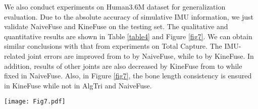 \documentclass[lettersize,journal]{IEEEtran}
\begin{document}
\begin{table}[!tp]
\caption{Ablation study on the usage of IMUs. Upper represents the upper arms and thighs while lower represents the forearms and calves. 4 and 8 denotes the number of IMUs attached to body bones.}
\begin{center}
\end{center}
\label{table3}
\end{table}

We also conduct experiments on Human3.6M dataset for generalization evaluation. Due to the absolute accuracy of simulative IMU information, we just validate NaiveFuse and KineFuse on the testing set. The qualitative and quantitative results are shown in Table \ref{table4} and Figure \ref{fig7}. We can obtain similar conclusions with that from experiments on Total Capture. The IMU-related joint errors are improved from 
to  by NaiveFuse, while to  by KineFuse. In addition, results of other joints are also decreased by KineFuse from  to  while fixed in NaiveFuse. Also, in Figure \ref{fig7}, the bone length consistency is ensured in KineFuse while not in AlgTri and NaiveFuse.

\begin{table}[!tp]
\caption{3D pose estimation errors (mm) of the ablation study in Human3.6M dataset. IMU-related joints contain the knees, ankles, elbows and wrists.}
\begin{center}
\end{center}
\label{table4}
\end{table}

\begin{figure*}[!tp]
 \begin{center}
 	\centerline{\texttt{[image: Fig7.pdf]}}
\caption{Illustration of different 3D pose results on Human3.6M dataset. Since there are no real IMU information, AdaDeepFuse is not explored here.}
\label{fig7}
\end{center}
\end{figure*}
\end{document}
